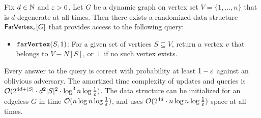\begin{theorem}\label{thm:FarVertex-new-deg}
	Fix $d\in \mathbb{N}$ and $\varepsilon>0$.
	Let $G$ be a dynamic graph on vertex set $V=\{1,\ldots,n\}$ that is $d$-degenerate at all times. Then there exists a randomized data structure $\mathsf{FarVertex}_{\varepsilon}[G]$ that provides access to the following query:
	\begin{itemize}
		\item $\mathtt{farVertex}(S,1)$: For a given set of vertices $S\subseteq V$, return a vertex $v$ that belongs to $V-N[S]$, or $\bot$ if no such vertex exists.
	\end{itemize}
	Every answer to the query is correct with probability at least $1-\varepsilon$ against an oblivious adversary.
	The amortized time complexity of updates and queries is $\mathcal{O}(2^{4d+|S|}\cdot d^2|S|^2\cdot \log^3 n \log \tfrac{1}{\varepsilon})$. The data structure can be initialized for an edgeless $G$ in time $\mathcal{O}(n\log n\log \tfrac{1}{\varepsilon})$, and uses $\mathcal{O}(2^{4d}\cdot n\log n\log \tfrac{1}{\varepsilon})$ space at all times.
\end{theorem}
